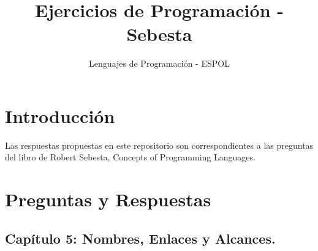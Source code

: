 \documentclass[12pt,oneside]{article}
\title{Ejercicios de Programación - Sebesta}
\author{Lenguajes de Programación - ESPOL}
\begin{document}
\maketitle

\section{Introducción}
Las respuestas propuestas en este repositorio son correspondientes a las preguntas del libro de Robert Sebesta, Concepts of Programming Languages.

\section{Preguntas y Respuestas}

\subsection{Capítulo 5: Nombres, Enlaces y Alcances.}
\end{document}
